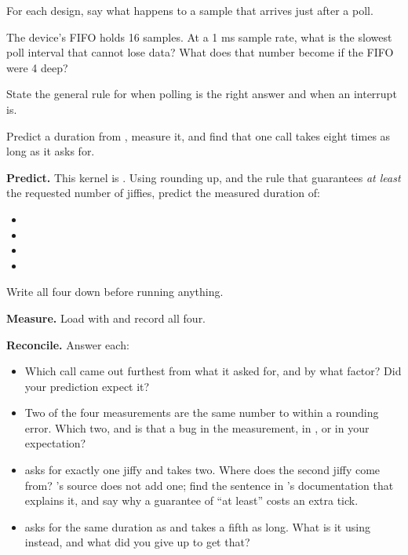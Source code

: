  For each design, say what happens to a sample that arrives just after a poll.

 The device's FIFO holds 16 samples. At a 1 ms sample rate, what is the slowest poll
interval that cannot lose data? What does that number become if the FIFO were 4 deep?

 State the general rule for when polling is the right answer and when an interrupt is.

\label{c9:ex:9}

Predict a duration from , measure it, and find that one call takes eight times as long as
it asks for.

 \textbf{Predict.} This kernel is . Using  rounding up,
and the rule that  guarantees \emph{at least} the requested number of
jiffies, predict the measured duration of:
\begin{itemize}
  \item {}
  \item {}
  \item {}
  \item {}
\end{itemize}
Write all four down before running anything.

 \textbf{Measure.} Load  with  and record all four.

 \textbf{Reconcile.} Answer each:
\begin{itemize}
  \item Which call came out furthest from what it asked for, and by what factor? Did your
    prediction expect it?
  \item Two of the four measurements are the same number to within a rounding error. Which two, and
    is that a bug in the measurement, in , or in your expectation?
  \item {} asks for exactly one jiffy and takes two. Where does the second jiffy come
    from? 's source does not add one; find the sentence in 's
    documentation that explains it, and say why a guarantee of ``at least'' costs an extra tick.
  \item {} asks for the same duration as  and takes a fifth
    as long. What is it using instead, and what did you give up to get that?
\end{itemize}

